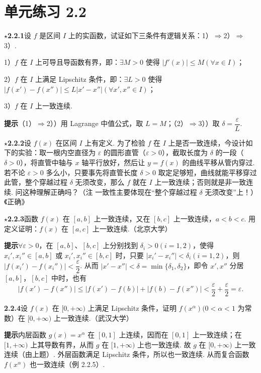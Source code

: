 \documentclass[UTF8,12pt,a4paper,fontset=fandol]{ctexart}
\begin{document}
\section*{单元练习 2.2}

\noindent\textbf{$\star$2.2.1}\quad 设 $f$ 是区间 $I$ 上的实函数，试证如下三条件有逻辑关系：1）$\Rightarrow$2）$\Rightarrow$3）.

1）$f$ 在 $I$ 上可导且导函数有界，即：$\exists M>0$ 使得 $|f'(x)|\le M(\forall x\in I)$；

2）$f$ 在 $I$ 上满足 Lipschitz 条件，即：$\exists L>0$ 使得 $|f(x')-f(x'')|\le L|x'-x''|(\forall x',x''\in I)$；

3）$f$ 在 $I$ 上一致连续.

\noindent\textbf{提示}\quad （1）$\Rightarrow$2））用 Lagrange 中值公式，取 $L=M$；（2）$\Rightarrow$3））取 $\delta=\dfrac\varepsilon L$.

\noindent\textbf{$\star$2.2.2}\quad 设 $f(x)$ 在区间 $I$ 上有定义. 为了检验 $f$ 在 $I$ 上是否一致连续，今设计如下的实验：取一根内空直径为 $\varepsilon$ 的圆形直管（$\varepsilon>0$），截取长度为 $\delta$ 的一段（$\delta>0$），将直管中轴与 $x$ 轴平行放好，然后让 $y=f(x)$ 的曲线平移从管内穿过. 若不论 $\varepsilon>0$ 多么小，只要事先将直管长度 $\delta>0$ 取定足够短，曲线就能平移穿过此管，整个穿越过程 $\delta$ 无须改变，那么 $f$ 就在 $I$ 上一致连续；否则就是非一致连续. 问这种理解正确吗？（注 一致性主要体现在“整个穿越过程 $\delta$ 无须改变”上！）\hfill《正确》

\noindent\textbf{$\star$2.2.3}\quad 函数 $f(x)$ 在 $[a,b]$ 上一致连续，又在 $[b,c]$ 上一致连续，$a<b<c$. 用定义证明：$f(x)$ 在 $[a,c]$ 上一致连续.（北京大学）

\noindent\textbf{提示}\quad $\forall\varepsilon>0$，在 $[a,b]$、$[b,c]$ 上分别找到 $\delta_i>0(i=1,2)$，使得 $x_i',x_i''\in[a,b]$ 或 $x_i',x_i''\in[b,c]$ 时，只要 $|x_i'-x_i''|<\delta_i(i=1,2)$，则 $|f(x_i')-f(x_i'')|<\dfrac\varepsilon2$. 从而 $|x'-x''|<\delta=\min\{\delta_1,\delta_2\}$，即令 $x',x''$ 分居 $[a,b]$，$[b,c]$ 中时，也有
\[
  |f(x')-f(x'')|\le |f(x')-f(b)|+|f(b)-f(x'')|<\frac\varepsilon2+\frac\varepsilon2=\varepsilon.
\]

\noindent\textbf{2.2.4}\quad 设 $f(x)$ 在 $[0,+\infty)$ 上满足 Lipschitz 条件，证明 $f(x^\alpha)(0<\alpha<1$ 为常数）在 $[0,+\infty)$ 上一致连续.（武汉大学）

\noindent\textbf{提示}\quad 内层函数 $g(x)=x^\alpha$ 在 $[0,1]$ 上连续，因而在 $[0,1]$ 上一致连续；在 $[1,+\infty)$ 上其导数有界，从而 $g$ 在 $[1,+\infty)$ 上也一致连续. 故 $g$ 在 $[0,+\infty)$ 上一致连续（由上题）. 外层函数满足 Lipschitz 条件，所以也一致连续. 从而复合函数 $f(x^\alpha)$ 也一致连续（例 2.2.5）.
\end{document}
